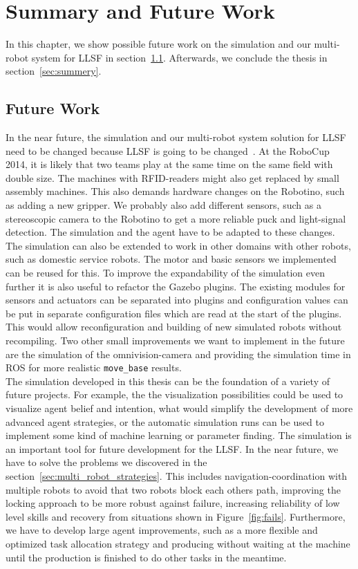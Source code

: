 \chapter{Summary and Future Work}
\label{cha:summery_and_future_work}
In this chapter, we show possible future work on the simulation and our multi-robot system for LLSF in section~\ref{sec:future_work}. Afterwards, we conclude the thesis in section~\ref{sec:summery}.

\section{Future Work}
\label{sec:future_work}
In the near future, the simulation and our multi-robot system solution for LLSF need to be changed because LLSF is going to be changed~\cite{llsf_changes}. At the RoboCup 2014, it is likely that two teams play at the same time on the same field with double size. The machines with RFID-readers might also get replaced by small assembly machines. This also demands hardware changes on the Robotino, such as adding a new gripper. We probably also add different sensors, such as a stereoscopic camera to the Robotino to get a more reliable puck and light-signal detection. The simulation and the agent have to be adapted to these changes.\\
The simulation can also be extended to work in other domains with other robots, such as domestic service robots. The motor and basic sensors we implemented can be reused for this. To improve the expandability of the simulation even further it is also useful to refactor the Gazebo plugins. The existing modules for sensors and actuators can be separated into plugins and configuration values can be put in separate configuration files which are read at the start of the plugins. This would allow reconfiguration and building of new simulated robots without recompiling. Two other small improvements we want to implement in the future are the simulation of the omnivision-camera and providing the simulation time in ROS for more realistic \texttt{move\_base} results.\\
The simulation developed in this thesis can be the foundation of a variety of future projects. For example, the the visualization possibilities could be used to visualize agent belief and intention, what would simplify the development of more advanced agent strategies, or the automatic simulation runs can be used to implement some kind of machine learning or parameter finding. The simulation is an important tool for future development for the LLSF. In the near future, we have to solve the problems we discovered in the section~\ref{sec:multi_robot_strategies}. This includes navigation-coordination with multiple robots to avoid that two robots block each others path, improving the locking approach to be more robust against failure, increasing reliability of low level skills and recovery from situations shown in Figure~\ref{fig:fails}. Furthermore, we have to develop large agent improvements, such as a more flexible and optimized task allocation strategy and producing without waiting at the machine until the production is finished to do other tasks in the meantime.

